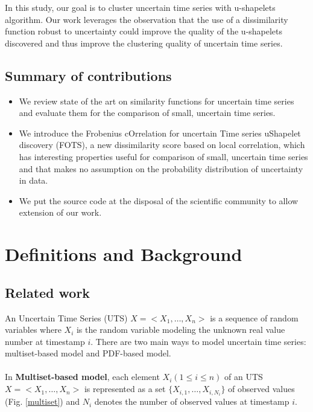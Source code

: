  
 In this study, our goal is to cluster uncertain time series with u-shapelets algorithm. Our work leverages the observation that the use of a dissimilarity function robust to uncertainty could improve the quality of the u-shapelets discovered and thus improve the clustering quality of uncertain time series.

\subsection{Summary of contributions}

\begin{itemize}
  \item We review state of the art on similarity functions for uncertain time
  series and evaluate them for the comparison of small, uncertain time series.  
  \item We introduce the Frobenius cOrrelation for uncertain Time series uShapelet
  discovery (FOTS), a  new dissimilarity score based on local correlation, which
  has interesting properties useful for comparison of small, uncertain  time
  series and that makes no assumption on the probability distribution of
  uncertainty in data.
\item We put the source code at the disposal of the scientific community to
allow extension of our work\cite{expe}.
\end{itemize}
\section[Background]{Definitions and Background}

\subsection{Related work}

An Uncertain Time Series (UTS) $X=<X_1, \ldots, X_n>$  is a sequence of random
variables where $X_i$  is the random variable modeling the unknown real value
number at timestamp $i$. There are two main ways to model uncertain time series:
multiset-based model and PDF-based model.   

\paragraph{}In \textbf{Multiset-based model}, each element $X_i (1 \leq i \leq n)$ of an UTS $X = <X_1, \ldots,  X_n>$ is represented as a set $\{X_{i,1}, \ldots, X_{i,N_i}\}$ of observed values (Fig. \ref{multiset}) and $N_i$
  denotes the number of observed values at timestamp $i$.
  
